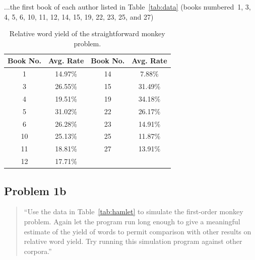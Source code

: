 \documentclass[conference]{IEEEtran}
\newcommand{\codefile}[1]{
  \begin{framed}
  \fontsize{5.65}{6.78}\selectfont
  
  \end{framed}
}
\begin{document}
...the first book of each author listed in Table~\ref{tab:data} (books numbered~1, 
3, 4, 5, 6, 10, 11, 12, 14, 15, 19, 22, 23, 25, and 27)

\codefile{problem1a.py}

\begin{table}
\caption{Relative word yield of the straightforward monkey problem.\label{tab:problem1a}}
\vspace{-10pt}
\begin{center}
\begin{tabular}{cccc}
\hline
Book No. & Avg. Rate & Book No. & Avg. Rate \\
\hline
1  & 14.97\% & 14 & 7.88\% \\
3  & 26.55\% & 15 & 31.49\% \\
4  & 19.51\% & 19 & 34.18\% \\
5  & 31.02\% & 22 & 26.17\% \\
6  & 26.28\% & 23 & 14.91\% \\
10 & 25.13\% & 25 & 11.87\% \\
11 & 18.81\% & 27 & 13.91\% \\
12 & 17.71\% & & \\
\hline
\end{tabular}
\end{center}
\end{table}


\subsection{Problem 1b}
\label{sec:problem1b}

\begin{quote}
``Use the data in Table~\ref{tab:hamlet} to simulate the first-order monkey problem. 
Again let the program run long enough to give a meaningful estimate of the yield 
of words to permit comparison with other results on relative word yield. Try running
this simulation program against other corpora.''
\end{quote}
\end{document}
